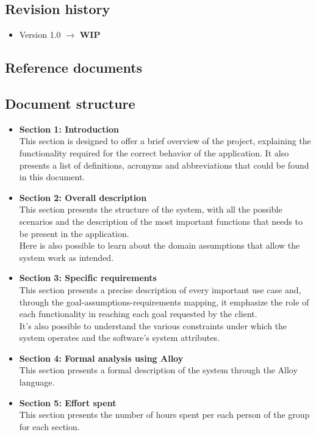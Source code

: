 \documentclass[11pt,twoside]{article}
\begin{document}
	\subsection{Revision history}	
\begin{itemize}
\item Version 1.0 $\rightarrow$ \textbf{WIP}
\end{itemize}
	\subsection{Reference documents}

	\subsection{Document structure}
\begin{itemize}
\item \textbf{Section 1: Introduction} \\
This section is designed to offer a brief overview of the project, explaining the functionality required for the correct behavior of the application. It also presents a list of definitions, acronyms and abbreviations that could be found in this document.
\item \textbf{Section 2: Overall description} \\
This section presents the structure of the system, with all the possible scenarios and the description of the most important functions that needs to be present in the application.\\
Here is also possible to learn about the domain assumptions that allow the system work as intended.
\item \textbf{Section 3: Specific requirements} \\
This section presents a precise description of every important use case and, through the goal-assumptions-requirements mapping, it emphasize the role of each functionality in reaching each goal requested by the client.\\
It's also possible to understand the various constraints under which the system operates and the software's system attributes.
\item \textbf{Section 4: Formal analysis using Alloy} \\
This section presents a formal description of the system through the Alloy language.
\item \textbf{Section 5: Effort spent} \\
This section presents the number of hours spent per each person of the group for each section.
\end{itemize}
\newpage
\end{document}
